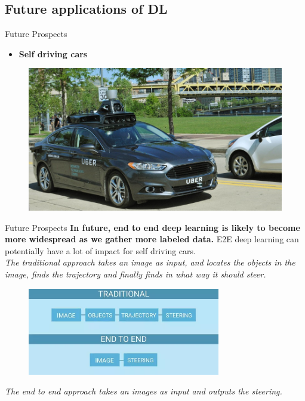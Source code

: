 \documentclass[10pt]{beamer}
\begin{document}
	\subsection{Future applications of DL}
	\begin{frame}[c]{Future Prospects}
		\begin{itemize}
			\item \large{\textbf{Self driving cars}}
		\end{itemize}
		\begin{figure}
			\includegraphics[width=\linewidth]{images/sdc2}
		\end{figure}
	\end{frame}
	\begin{frame}[c]{Future Prospects}
		\textbf{In future, end to end deep learning is likely to become more widespread as we gather more labeled data.} E2E deep learning can potentially have a lot of impact for self driving cars.\\
		\textit{The traditional approach takes an image as input, and locates the objects in the image, finds the trajectory and finally finds in what way it should steer.}
		\begin{figure}
			\includegraphics[width=\linewidth, height=1.5in]{images/sdc}
		\end{figure}
		\textit{The end to end approach takes an images as input and outputs the steering.}
	\end{frame}
\end{document}
